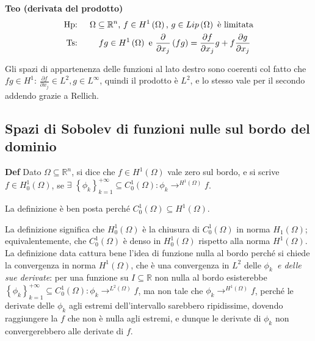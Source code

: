 \documentclass{article}
\begin{document}
\textbf{Teo (derivata del prodotto)}%
\begin{eqnarray*}
\text{Hp}\text{: } &&\Omega \subseteq 
\mathbb{R}
^{n}\text{, }f\in H^{1}\left( \Omega \right) \text{, }g\in Lip\left( \Omega
\right) \text{ \`{e} limitata} \\
\text{Ts}\text{: } &&fg\in H^{1}\left( \Omega \right) \text{ e }\frac{%
\partial }{\partial x_{j}}\left( fg\right) =\frac{\partial f}{\partial x_{j}}%
g+f\frac{\partial g}{\partial x_{j}}\text{ }
\end{eqnarray*}

Gli spazi di appartenenza delle funzioni al lato destro sono coerenti col
fatto che $fg\in H^{1}$: $\frac{\partial f}{\partial x_{j}}\in L^{2},g\in
L^{\infty }$, quindi il prodotto \`{e} $L^{2}$, e lo stesso vale per il
secondo addendo grazie a Rellich.

\subsection{Spazi di Sobolev di funzioni nulle sul bordo del dominio}

\textbf{Def} Dato $\Omega \subseteq 
\mathbb{R}
^{n}$, si dice che $f\in H^{1}\left( \Omega \right) $ vale zero sul bordo, e
si scrive $f\in H_{0}^{1}\left( \Omega \right) $, se $\exists $ $\left\{
\phi _{k}\right\} _{k=1}^{+\infty }\subseteq C_{0}^{1}\left( \Omega \right)
:\phi _{k}\rightarrow ^{H^{1}\left( \Omega \right) }f$.

La definizione \`{e} ben posta perch\'{e} $C_{0}^{1}\left( \Omega \right)
\subseteq H^{1}\left( \Omega \right) $.

La definizione significa che $H_{0}^{1}\left( \Omega \right) $ \`{e} la
chiusura di $C_{0}^{1}\left( \Omega \right) $ in norma $H_{1}\left( \Omega
\right) $; equivalentemente, che $C_{0}^{1}\left( \Omega \right) $ \`{e}
denso in $H_{0}^{1}\left( \Omega \right) $ rispetto alla norma $H^{1}\left(
\Omega \right) $. La definizione data cattura bene l'idea di funzione nulla
al bordo perch\'{e} si chiede la convergenza in norma $H^{1}\left( \Omega
\right) $, che \`{e} una convergenza in $L^{2}$ delle $\phi _{k}$\textit{\ e
delle sue derivate}: per una funzione su $I\subseteq 
\mathbb{R}
$ non nulla al bordo esisterebbe $\left\{ \phi _{k}\right\} _{k=1}^{+\infty
}\subseteq C_{0}^{1}\left( \Omega \right) :\phi _{k}\rightarrow
^{L^{2}\left( \Omega \right) }f$, ma non tale che $\phi _{k}\rightarrow
^{H^{1}\left( \Omega \right) }f$, perch\'{e} le derivate delle $\phi _{k}$
agli estremi dell'intervallo sarebbero ripidissime, dovendo raggiungere la $%
f $ che non \`{e} nulla agli estremi, e dunque le derivate di $\phi _{k}$
non convergerebbero alle derivate di $f$.
\end{document}
